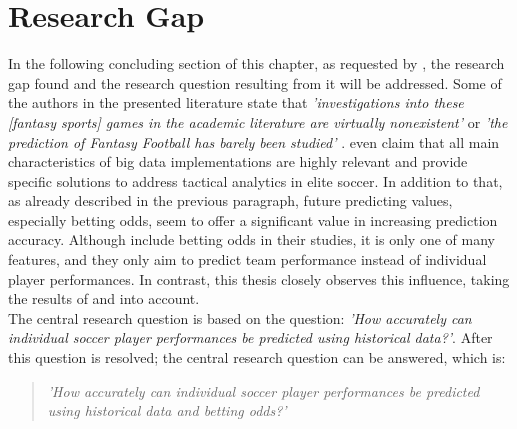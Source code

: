 \section{Research Gap}
In the following concluding section of this chapter, as requested by \citet{webster_guest_2002}, the research gap found and the research question resulting from it will be addressed. Some of the authors in the presented literature state that \emph{'investigations into these [fantasy sports] games in the academic literature are virtually nonexistent'} \parencite[, p. 1]{landers_machine_2017} or \emph{'the prediction of Fantasy Football has barely been studied'} \parencite[, p. 1]{lutz_fantasy_2015}. \citet{rein_big_2016} even claim that all main characteristics of big data implementations are highly relevant and provide specific solutions to address tactical analytics in elite soccer. In addition to that, as already described in the previous paragraph, future predicting values, especially betting odds, seem to offer a significant value in increasing prediction accuracy. Although \citet{deng_analysis_2020} include betting odds in their studies, it is only one of many features, and they only aim to predict team performance instead of individual player performances. In contrast, this thesis closely observes this influence, taking the results of \citet{wheatcroft_profiting_2020} and \citet{goldstein_wisdom_2014} into account. \\
The central research question is based on the question: \emph{'How accurately can individual soccer player performances be predicted using historical data?'}. After this question is resolved; the central research question can be answered, which is:
\begin{quote}
    \centering
    \emph{'How accurately can individual soccer player performances be predicted using historical data and betting odds?'}
    \label{research_question}
\end{quote}